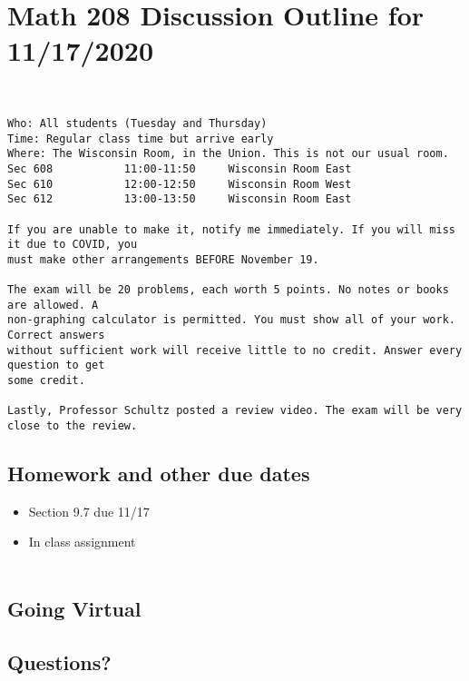 \documentclass[14pt]{extarticle}
\begin{document}
\section*{Math 208 Discussion Outline for 11/17/2020}

\begin{tcolorbox}[enhanced jigsaw,colback=bg,boxrule=0pt,arc=0pt]
	\\
\footnotesize{
\begin{verbatim}
Who: All students (Tuesday and Thursday)
Time: Regular class time but arrive early
Where: The Wisconsin Room, in the Union. This is not our usual room.
Sec 608           11:00-11:50     Wisconsin Room East
Sec 610           12:00-12:50     Wisconsin Room West
Sec 612           13:00-13:50     Wisconsin Room East

If you are unable to make it, notify me immediately. If you will miss it due to COVID, you 
must make other arrangements BEFORE November 19.

The exam will be 20 problems, each worth 5 points. No notes or books are allowed. A 
non-graphing calculator is permitted. You must show all of your work. Correct answers 
without sufficient work will receive little to no credit. Answer every question to get 
some credit.

Lastly, Professor Schultz posted a review video. The exam will be very close to the review.
\end{verbatim}
}

\end{tcolorbox}


\subsection{Homework and other due dates}
\begin{itemize}

\item Section 9.7 due 11/17
\item In class assignment \\\\
\end{itemize}

\subsection{Going Virtual}

\subsection{Questions?}
\end{document}

